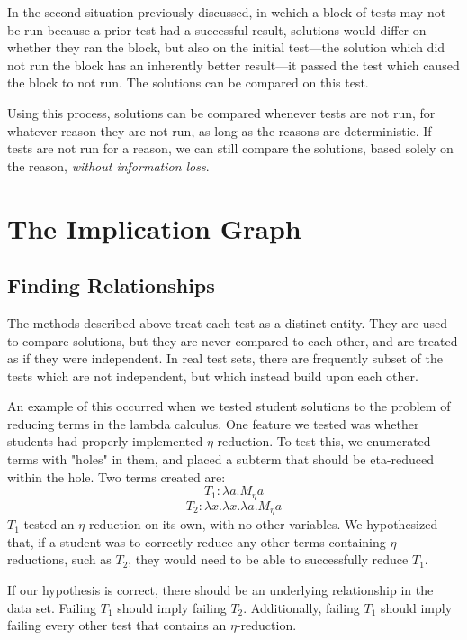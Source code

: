 \documentclass[11pt,twoside]{article}
\begin{document}
In the second situation previously discussed, in wehich a block of tests may not be run because a prior test had a successful result, solutions would differ on whether they ran the block, but also on the initial test---the solution which did not run the block has an inherently better result---it passed the test which caused the block to not run. The solutions can be compared on this test.

Using this process, solutions can be compared whenever tests are not run, for whatever reason they are not run, as long as the reasons are deterministic. If tests are not run for a reason, we can still compare the solutions, based solely on the reason, \emph{without information loss}.

\section{The Implication Graph}
\subsection{Finding Relationships}
The methods described above treat each test as a distinct entity. They are used to compare solutions, but they are never compared to each other, and are treated as if they were independent. In real test sets, there are frequently subset of the tests which are not independent, but which instead build upon each other.

An example of this occurred when we tested student solutions to the problem of reducing terms in the lambda calculus. One feature we tested was whether students had properly implemented $\eta$-reduction. To test this, we enumerated terms with "holes" in them, and placed a subterm that should be eta-reduced within the hole. Two terms created are: 
$$T_1 : \lambda a.M_\eta a$$
$$T_2 : \lambda x.\lambda x.\lambda a.M_\eta a$$
$T_1$ tested an $\eta$-reduction on its own, with no other variables. We hypothesized that, if a student was to correctly reduce any other terms containing $\eta$-reductions, such as $T_2$, they would need to be able to successfully reduce $T_1$.

If our hypothesis is correct, there should be an underlying relationship in the data set. Failing $T_1$ should imply failing $T_2$. Additionally, failing $T_1$ should imply failing every other test that contains an $\eta$-reduction.
\end{document}
